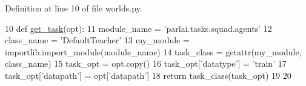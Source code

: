 Definition at line 10 of file worlds.\+py.


\begin{DoxyCode}
10 \textcolor{keyword}{def }\hyperlink{namespaceparlai_1_1chat__service_1_1tasks_1_1qa__data__collection_1_1worlds_a2e51acfa39bb591f618ea3716f7d35e0}{get\_task}(opt):
11     module\_name = \textcolor{stringliteral}{'parlai.tasks.squad.agents'}
12     class\_name = \textcolor{stringliteral}{'DefaultTeacher'}
13     my\_module = importlib.import\_module(module\_name)
14     task\_class = getattr(my\_module, class\_name)
15     task\_opt = opt.copy()
16     task\_opt[\textcolor{stringliteral}{'datatype'}] = \textcolor{stringliteral}{'train'}
17     task\_opt[\textcolor{stringliteral}{'datapath'}] = opt[\textcolor{stringliteral}{'datapath'}]
18     \textcolor{keywordflow}{return} task\_class(task\_opt)
19 
20 
\end{DoxyCode}
